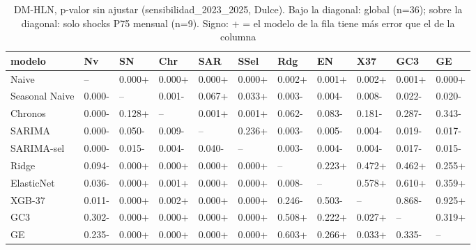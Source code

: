 \begin{table}[H]
\centering
\small
\caption{DM-HLN, p-valor sin ajustar (sensibilidad\_2023\_2025, Dulce). Bajo la diagonal: global (n=36); sobre la diagonal: solo shocks P75 mensual (n=9). Signo: + = el modelo de la fila tiene más error que el de la columna}
\label{tab:T09_DM_matriz_sensibilidad_2023_2025_dulce}
\begin{tabular}{lllllllllll}
\toprule
modelo & Nv & SN & Chr & SAR & SSel & Rdg & EN & X37 & GC3 & GE \\
\midrule
Naive & -- & 0.000+ & 0.000+ & 0.000+ & 0.000+ & 0.002+ & 0.001+ & 0.002+ & 0.001+ & 0.000+ \\
Seasonal Naive & 0.000- & -- & 0.001- & 0.067+ & 0.033+ & 0.003- & 0.004- & 0.008- & 0.022- & 0.020- \\
Chronos & 0.000- & 0.128+ & -- & 0.001+ & 0.001+ & 0.062- & 0.083- & 0.181- & 0.287- & 0.343- \\
SARIMA & 0.000- & 0.050- & 0.009- & -- & 0.236+ & 0.003- & 0.005- & 0.004- & 0.019- & 0.017- \\
SARIMA-sel & 0.000- & 0.015- & 0.004- & 0.040- & -- & 0.003- & 0.004- & 0.004- & 0.017- & 0.015- \\
Ridge & 0.094- & 0.000+ & 0.000+ & 0.000+ & 0.000+ & -- & 0.223+ & 0.472+ & 0.462+ & 0.255+ \\
ElasticNet & 0.036- & 0.000+ & 0.001+ & 0.000+ & 0.000+ & 0.008- & -- & 0.578+ & 0.610+ & 0.359+ \\
XGB-37 & 0.011- & 0.000+ & 0.002+ & 0.000+ & 0.000+ & 0.246- & 0.503- & -- & 0.868- & 0.925+ \\
GC3 & 0.302- & 0.000+ & 0.000+ & 0.000+ & 0.000+ & 0.508+ & 0.222+ & 0.027+ & -- & 0.319+ \\
GE & 0.235- & 0.000+ & 0.000+ & 0.000+ & 0.000+ & 0.603+ & 0.266+ & 0.033+ & 0.335- & -- \\
\bottomrule
\end{tabular}
\end{table}